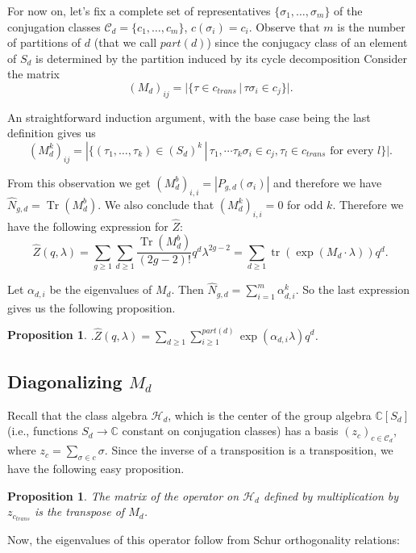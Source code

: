 \documentclass{article}
\numberwithin{equation}{section}
\numberwithin{figure}{section}
\theoremstyle{plain}
\newtheorem{proposition}[theorem]{Proposition}
\theoremstyle{definition}
\numberwithin{equation}{section}
\newtheorem[S, bodystyle=\normalfont\noindent]{defiS}{Definition}[section]
\begin{document}
For now on, let's fix a complete set of representatives $\{\sigma_1,\ldots,\sigma_m\}$ of the conjugation classes $\mathcal{C}_d=\{c_1,\ldots,c_m\}$, $c(\sigma_i)=c_i$. Observe that $m$ is the number of partitions of $d$ (that we call $part(d)$) since the conjugacy class of an element of $S_d$ is determined by the partition induced by its cycle decomposition Consider the matrix $$(M_d)_{ij}=|\{\tau\in c_{trans}\, |\, \tau\sigma_i\in c_j\}|.$$

An straightforward induction argument, with the base case being the last definition gives us $$(M_d^k)_{ij}=|\{(\tau_1,\ldots,\tau_k)\in (S_d)^k\, | \, \tau_1,\cdots\tau_k\sigma_i\in c_j, \tau_l\in c_{trans}\text{ for every }l\}|.$$ 

From this observation we get $(M_d^b)_{i,i}=|P_{g,d}(\sigma_i)|$ and therefore we have $\hat{N}_{g,d}=\operatorname{Tr}(M_d^{b})$. We also conclude that $(M_d^k)_{i,i}=0$ for odd $k$. Therefore we have the following expression for $\hat{Z}$:
\[
\hat{Z}(q,\lambda)=\sum_{g\geq 1}\sum_{d\geq 1}\frac{\operatorname{Tr}(M_d^{b})}{(2g-2)!}q^d\lambda^{2g-2}=\sum_{d\geq 1}\operatorname{tr}(\exp(M_d\cdot \lambda))q^d.
\]

Let $\alpha_{d,i}$ be the eigenvalues of $M_d$. Then $\hat{N}_{g,d}=\sum_{i=1}^m \alpha_{d,i}^k$. So the last expression gives us the following proposition.

\begin{proposition}
$.\hat{Z}(q,\lambda)=\sum_{d\geq 1}\sum_{i\geq 1}^{part(d)}\exp(\alpha_{d,i}\lambda)q^d$.
\end{proposition}


\subsection{Diagonalizing $M_d$}

Recall that the class algebra $\mathcal{H}_d$, which is the center of the group algebra $\mathbb{C}[S_d]$  (i.e., functions $S_d\rightarrow \mathbb{C}$ constant on conjugation classes) has a basis $(z_c)_{c\in \mathcal{C}_d}$, where $z_c=\sum_{\sigma\in c}\sigma$. Since the inverse of a transposition is a transposition, we have the following easy proposition.

\begin{proposition}
The matrix of the operator on $\mathcal{H}_d$ defined by multiplication by $z_{c_{trans}}$ is the transpose of $M_d$.
\end{proposition}

Now, the eigenvalues of this operator follow from Schur orthogonality relations: 
\end{document}
